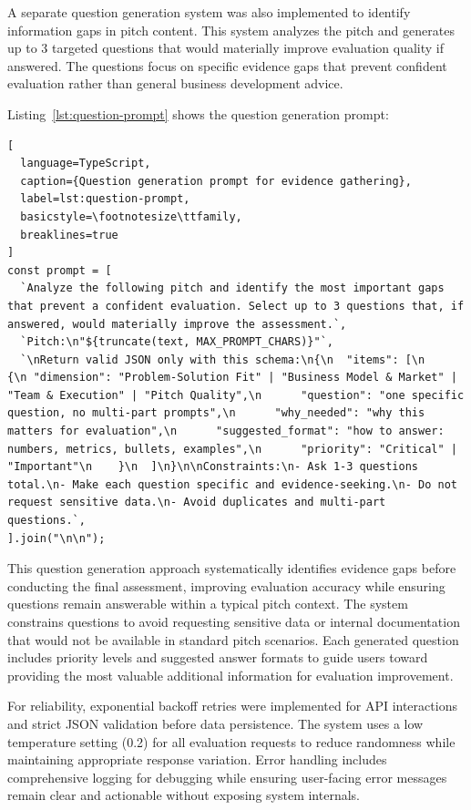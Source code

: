 A separate question generation system was also implemented to identify information gaps in pitch content. This system analyzes the pitch and generates up to 3 targeted questions that would materially improve evaluation quality if answered. The questions focus on specific evidence gaps that prevent confident evaluation rather than general business development advice.

Listing~\ref{lst:question-prompt} shows the question generation prompt:

\begin{lstlisting}[
  language=TypeScript,
  caption={Question generation prompt for evidence gathering},
  label=lst:question-prompt,
  basicstyle=\footnotesize\ttfamily,
  breaklines=true
]
const prompt = [
  `Analyze the following pitch and identify the most important gaps that prevent a confident evaluation. Select up to 3 questions that, if answered, would materially improve the assessment.`,
  `Pitch:\n"${truncate(text, MAX_PROMPT_CHARS)}"`,
  `\nReturn valid JSON only with this schema:\n{\n  "items": [\n    {\n "dimension": "Problem-Solution Fit" | "Business Model & Market" | "Team & Execution" | "Pitch Quality",\n      "question": "one specific question, no multi-part prompts",\n      "why_needed": "why this matters for evaluation",\n      "suggested_format": "how to answer: numbers, metrics, bullets, examples",\n      "priority": "Critical" | "Important"\n    }\n  ]\n}\n\nConstraints:\n- Ask 1-3 questions total.\n- Make each question specific and evidence-seeking.\n- Do not request sensitive data.\n- Avoid duplicates and multi-part questions.`,
].join("\n\n");
\end{lstlisting}


This question generation approach systematically identifies evidence gaps before conducting the final assessment, improving evaluation accuracy while ensuring questions remain answerable within a typical pitch context. The system constrains questions to avoid requesting sensitive data or internal documentation that would not be available in standard pitch scenarios. Each generated question includes priority levels and suggested answer formats to guide users toward providing the most valuable additional information for evaluation improvement.

For reliability, exponential backoff retries were implemented for API interactions and strict JSON validation before data persistence. The system uses a low temperature setting (0.2) for all evaluation requests to reduce randomness while maintaining appropriate response variation. Error handling includes comprehensive logging for debugging while ensuring user-facing error messages remain clear and actionable without exposing system internals.

